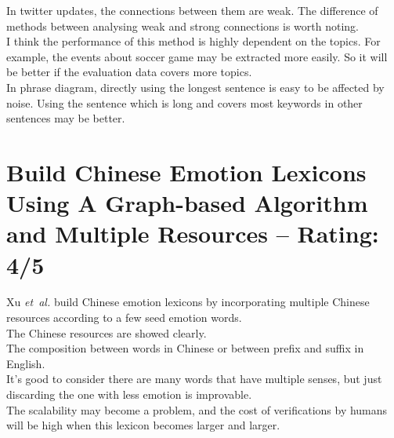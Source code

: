 \documentclass[a4paper]{article}
\begin{document}
In twitter updates, the connections between them are weak. The difference of methods between analysing weak and strong connections is worth noting.\\ 

I think the performance of this method is highly dependent on the topics. For example, the events about soccer game may be extracted more easily. So it will be better if the evaluation data covers more topics.\\

In phrase diagram, directly using the longest sentence is easy to be affected by noise. Using the sentence which is long and covers most keywords in other sentences may be better.


\section{Build Chinese Emotion Lexicons Using A Graph-based Algorithm and Multiple Resources -- Rating: 4/5}
Xu \emph{et~al.} \cite{Xu:COLING10} build Chinese emotion lexicons by incorporating multiple Chinese resources according to a few seed emotion words. \\

The Chinese resources are showed clearly.\\

The composition between words in Chinese or between prefix and suffix in English.\\ 

It's good to consider there are many words that have multiple senses, but just discarding the one with less emotion is improvable.\\

The scalability may become a problem, and the cost of verifications by humans will be high when this lexicon becomes larger and larger.


\end{document}
